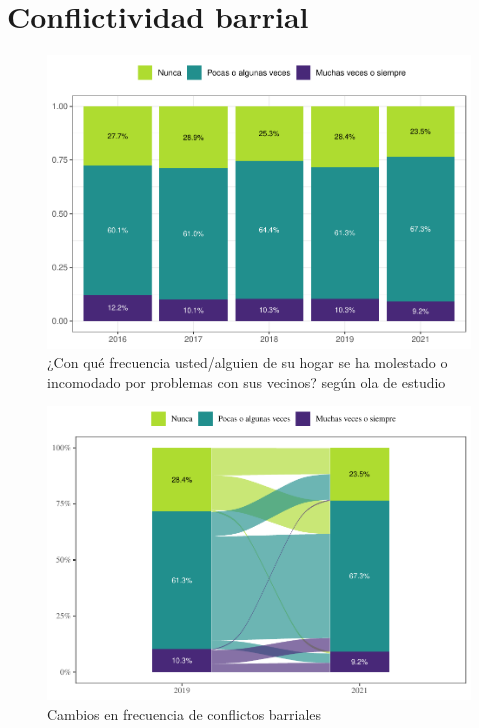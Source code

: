 \documentclass[
  12pt,
]{book}
\begin{document}
\hypertarget{conflictividad-barrial}{%
\section{Conflictividad barrial}\label{conflictividad-barrial}}

\begin{figure}

{\centering \includegraphics{reporte-elsoc_files/figure-latex/confli-olas-1} 

}

\caption{¿Con qué frecuencia usted/alguien de su hogar se ha molestado o incomodado por problemas con sus vecinos? según ola de estudio }\label{fig:confli-olas}
\end{figure}

\begin{figure}

{\centering \includegraphics{reporte-elsoc_files/figure-latex/confli-cambio-1} 

}

\caption{Cambios en frecuencia de conflictos barriales}\label{fig:confli-cambio}
\end{figure}
\end{document}
